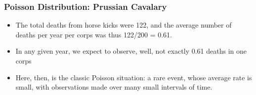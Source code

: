 \documentclass[MASTER.tex]{subfiles}
\begin{document}
\begin{frame}
	\frametitle{Poisson Distribution: Prussian Cavalary}
	\Large
	\begin{itemize}
\item The total deaths from horse kicks were 122, and the average number of deaths per year per corps was thus 122/200 = 0.61. 
\item In any given year, we expect to observe, well, not exactly 0.61 deaths in one corps 
\item Here, then, is the classic Poisson situation: a rare event, whose average rate is small, with observations made over many small intervals of time.
\end{itemize}
\end{frame}
\end{document}
